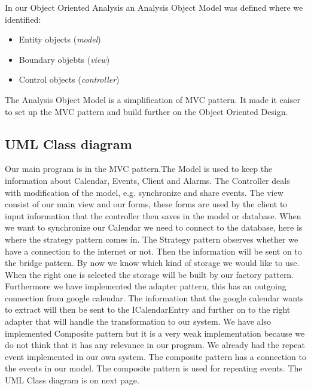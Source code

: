 \newpage
In our Object Oriented Analysis an Analysis Object Model was defined where we identified:
\begin{itemize}
	\item Entity objects (\emph{model})
	\item Boundary objebts (\emph{view})
	\item Control objects (\emph{controller})
\end{itemize}


The Analysis Object Model is a simplification of MVC pattern. It made it eaiser to set up the MVC pattern and build further on the Object Oriented Design. 

\subsection*{UML Class diagram}
Our main program is in the MVC pattern.The Model is used to keep the information about Calendar, Events, Client and Alarms. The Controller deals with modification of the model, e.g. synchronize and share events. The view consist of our main view and our forms, these forms are used by the client to input information that the controller then saves in the model or database.
When we want to synchronize our Calendar we need to connect to the database, here is where the strategy pattern comes in. The Strategy pattern observes whether we have a connection to the internet or not. Then the information will be sent on to the bridge pattern. By now we know which kind of storage we would like to use. When the right one is selected the storage will be built by our factory pattern. 
Furthermore we have implemented the adapter pattern, this has an outgoing connection from google calendar. The information that the google calendar wants to extract will then be sent to the ICalendarEntry and further on to the right adapter that will handle the transformation to our system. 
We have also implemented Composite pattern but it is a very weak implementation because we do not think that it has any relevance in our program. We already had the repeat event implemented in our own system. The composite pattern has a connection to the events in our model. The composite pattern is used for repeating events.
\newline
The UML Class diagram is on next page.

